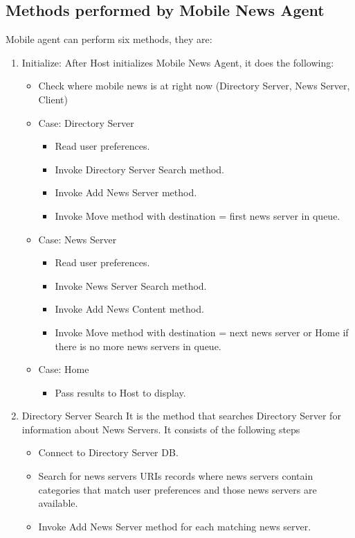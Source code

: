 \documentclass[12pt,a4paper,final,twoside,onecolumn,titlepage]{book}
\begin{document}
\subsection{Methods performed by Mobile News Agent}
Mobile agent can perform six methods, they are:
\begin{enumerate}
\item Initialize: After Host initializes Mobile News Agent, it does the following:
\begin{itemize}
\item Check where mobile news is at right now (Directory Server, News Server, Client)
\item Case: Directory Server
\begin{itemize}
\item Read user preferences.
\item Invoke Directory Server Search method.
\item Invoke Add News Server method.
\item Invoke Move method with destination = first news server in queue.
\end{itemize}
\item Case: News Server
\begin{itemize}
\item Read user preferences.
\item Invoke News Server Search method.
\item Invoke Add News Content method.
\item Invoke Move method with destination = next news server or Home if there is no more news servers in queue.
\end{itemize}
\item Case: Home
\begin{itemize}
\item Pass results to Host to display. 
\end{itemize}
\end{itemize}
\item Directory Server Search
It is the method that searches Directory Server for information about News Servers. It consists of the following steps
\begin{itemize}
\item Connect to Directory Server \gls{DB}.
\item Search for news servers URIs records where news servers contain categories that match user preferences and those news servers are available.
\item Invoke Add News Server method for each matching news server.

\end{itemize}
\end{enumerate}
\end{document}
